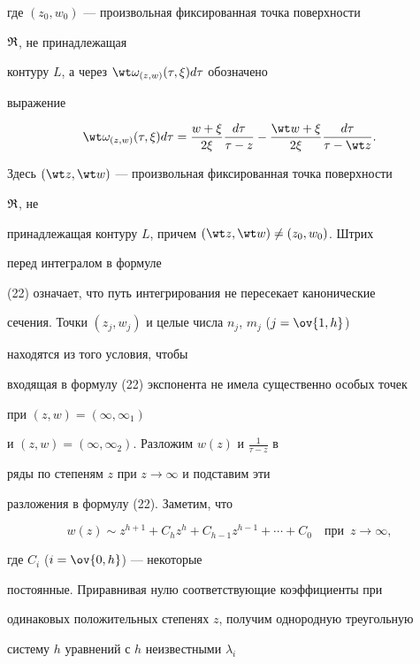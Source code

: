 где $(z_0,w_0)$ --- произвольная фиксированная точка поверхности 


$\frak R$, не принадлежащая 


контуру $L$, а через $\wt\omega_{(z,w)}(\tau,\xi)d\tau$ обозначено 


выражение 


$$ 


\wt\omega_{(z,w)}(\tau,\xi)d\tau= 


\frac{w+\xi}{2\xi}\frac{d\tau}{\tau-z}- 


\frac{\wt w+\xi}{2\xi}\frac{d\tau}{\tau-\wt z}. 


$$ 


Здесь $(\wt z,\wt w)$ --- произвольная фиксированная точка поверхности 


$\frak R$, не 


принадлежащая контуру $L$, причем $(\wt z,\wt w)\ne(z_0,w_0)$. Штрих 


перед интегралом в формуле 


(22) означает, что путь интегрирования не пересекает канонические 


сечения. Точки $(z_j,w_j)$ и целые числа $n_j$, $m_j$ ($j=\ov{1,h}$) 


находятся из того условия, чтобы 


входящая в формулу (22) экспонента не имела существенно особых точек 


при $(z,w)=(\infty,\infty_1)$ 


и $(z,w)=(\infty,\infty_2)$. Разложим $w(z)$ и $\frac{1}{\tau-z}$ в 


ряды по степеням $z$ при $z\to\infty$ и подставим эти 


разложения в формулу (22). Заметим, что 


$$ 


w(z)\sim z^{h+1}+C_h z^h+C_{h-1}z^{h-1}+\dotsb+C_0\quad 


\text{при}\ \; z\to\infty, 


$$ 


где $C_i$ ($i=\ov{0,h}$) --- некоторые 


постоянные. Приравнивая нулю соответствующие коэффициенты при 


одинаковых положительных степенях $z$, получим однородную треугольную 


систему $h$ уравнений с $h$ неизвестными $\lambda_i$ 


